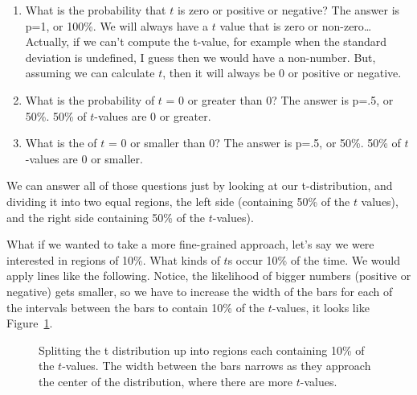 \documentclass[
  letterpaper,
  DIV=11,
  numbers=noendperiod]{scrreprt}
\begin{document}
\begin{enumerate}
\def\labelenumi{\arabic{enumi}.}
\item
  What is the probability that \(t\) is zero or positive or negative?
  The answer is p=1, or 100\%. We will always have a \(t\) value that is
  zero or non-zero\ldots Actually, if we can't compute the t-value, for
  example when the standard deviation is undefined, I guess then we
  would have a non-number. But, assuming we can calculate \(t\), then it
  will always be 0 or positive or negative.
\item
  What is the probability of \(t\) = 0 or greater than 0? The answer is
  p=.5, or 50\%. 50\% of \(t\)-values are 0 or greater.
\item
  What is the of \(t\) = 0 or smaller than 0? The answer is p=.5, or
  50\%. 50\% of \(t\)-values are 0 or smaller.
\end{enumerate}

We can answer all of those questions just by looking at our
t-distribution, and dividing it into two equal regions, the left side
(containing 50\% of the \(t\) values), and the right side containing
50\% of the \(t\)-values).

What if we wanted to take a more fine-grained approach, let's say we
were interested in regions of 10\%. What kinds of \(t\)s occur 10\% of
the time. We would apply lines like the following. Notice, the
likelihood of bigger numbers (positive or negative) gets smaller, so we
have to increase the width of the bars for each of the intervals between
the bars to contain 10\% of the \(t\)-values, it looks like
Figure~\ref{fig-7percentregions}.

\begin{figure}


\caption{\label{fig-7percentregions}Splitting the t distribution up into
regions each containing 10\% of the \(t\)-values. The width between the
bars narrows as they approach the center of the distribution, where
there are more \(t\)-values.}

\end{figure}%
\end{document}
